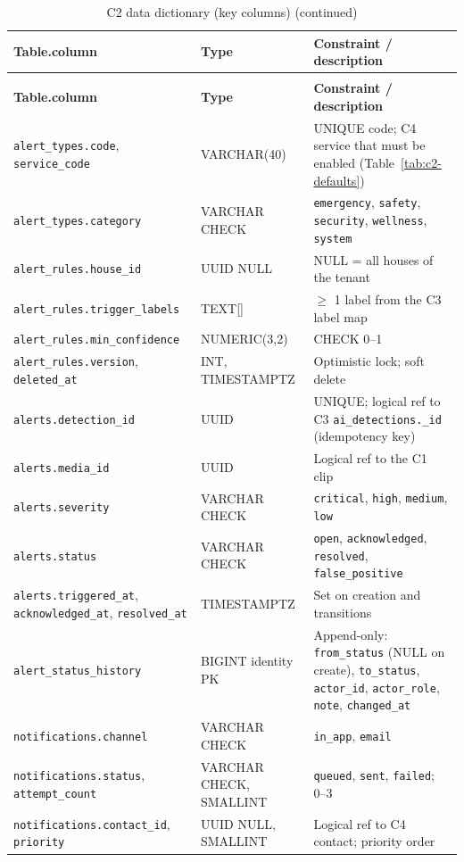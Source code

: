 \begin{longtable}{L{4.6cm}L{3.0cm}L{7.0cm}}
\caption{C2 data dictionary (key columns)}\label{tab:c2-dd}\\
\toprule
\textbf{Table.column} & \textbf{Type} & \textbf{Constraint / description} \\
\midrule
\endfirsthead
\caption[]{C2 data dictionary (key columns) (continued)}\\
\toprule
\textbf{Table.column} & \textbf{Type} & \textbf{Constraint / description} \\
\midrule
\endhead
\texttt{alert\_types.code}, \texttt{service\_code} & VARCHAR(40) & UNIQUE code; C4 service that must be enabled (Table~\ref{tab:c2-defaults}) \\
\texttt{alert\_types.category} & VARCHAR CHECK & \texttt{emergency}, \texttt{safety}, \texttt{security}, \texttt{wellness}, \texttt{system} \\
\texttt{alert\_rules.house\_id} & UUID NULL & NULL = all houses of the tenant \\
\texttt{alert\_rules.trigger\_labels} & TEXT[] & $\ge$ 1 label from the C3 label map \\
\texttt{alert\_rules.min\_confidence} & NUMERIC(3,2) & CHECK 0--1 \\
\texttt{alert\_rules.version}, \texttt{deleted\_at} & INT, TIMESTAMPTZ & Optimistic lock; soft delete \\
\texttt{alerts.detection\_id} & UUID & UNIQUE; logical ref to C3 \texttt{ai\_detections.\_id} (idempotency key) \\
\texttt{alerts.media\_id} & UUID & Logical ref to the C1 clip \\
\texttt{alerts.severity} & VARCHAR CHECK & \texttt{critical}, \texttt{high}, \texttt{medium}, \texttt{low} \\
\texttt{alerts.status} & VARCHAR CHECK & \texttt{open}, \texttt{acknowledged}, \texttt{resolved}, \texttt{false\_positive} \\
\texttt{alerts.triggered\_at}, \texttt{acknowledged\_at}, \texttt{resolved\_at} & TIMESTAMPTZ & Set on creation and transitions \\
\texttt{alert\_status\_history} & BIGINT identity PK & Append-only: \texttt{from\_status} (NULL on create), \texttt{to\_status}, \texttt{actor\_id}, \texttt{actor\_role}, \texttt{note}, \texttt{changed\_at} \\
\texttt{notifications.channel} & VARCHAR CHECK & \texttt{in\_app}, \texttt{email} \\
\texttt{notifications.status}, \texttt{attempt\_count} & VARCHAR CHECK, SMALLINT & \texttt{queued}, \texttt{sent}, \texttt{failed}; 0--3 \\
\texttt{notifications.contact\_id}, \texttt{priority} & UUID NULL, SMALLINT & Logical ref to C4 contact; priority order \\
\bottomrule
\end{longtable}

